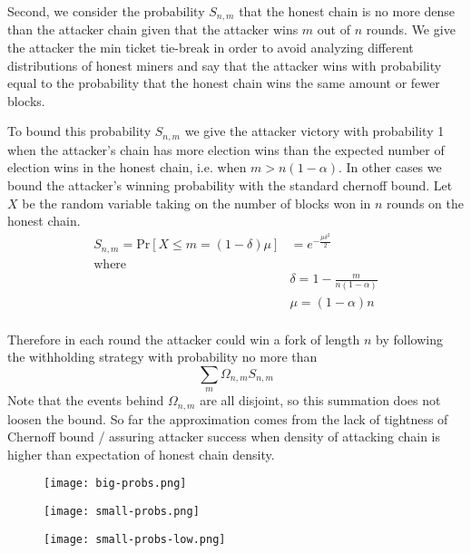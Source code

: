 \documentclass{article}
\begin{document}
Second, we consider the probability $S_{n,m}$ that the honest chain is no more dense than the attacker chain given that the attacker wins $m$ out of $n$ rounds.  We give the attacker the min ticket tie-break in order to avoid analyzing different distributions of honest miners and say that the attacker wins with probability equal to the probability that the honest chain wins the same amount or fewer blocks.

To bound this probability $S_{n,m}$ we give the attacker victory with probability 1 when the attacker's chain has more election wins than the expected number of election wins in the honest chain, i.e. when $m > n(1-\alpha)$.  In other cases we bound the attacker's winning probability with the standard chernoff bound.  Let $X$ be the random variable taking on the number of blocks won in $n$ rounds on the honest chain.
\begin{align*}
    S_{n,m} = \text{Pr}[X \leq m = (1-\delta)\mu]&=e^{-\frac{\mu \delta^2}{2}}\\
    \text{where}\\
    &\delta = 1 - \frac{m}{n(1-\alpha)}\\
    &\mu = (1 - \alpha)n\\
\end{align*}

Therefore in each round the attacker could win a fork of length $n$ by following the withholding strategy with probability no more than 
$$
\sum_m \Omega_{n,m} S_{n,m}
$$
Note that the events behind $\Omega_{n,m}$ are all disjoint, so this summation does not loosen the bound.  So far the approximation comes from the lack of tightness of Chernoff bound / assuring attacker success when density of attacking chain is higher than expectation of honest chain density.

\begin{figure}[!ht]
  \centering
  \texttt{[image: big-probs.png]}
\end{figure}

\begin{figure}[!ht]
  \centering
  \texttt{[image: small-probs.png]}
\end{figure}

\begin{figure}[!ht]
  \centering
  \texttt{[image: small-probs-low.png]}
\end{figure}
\end{document}
